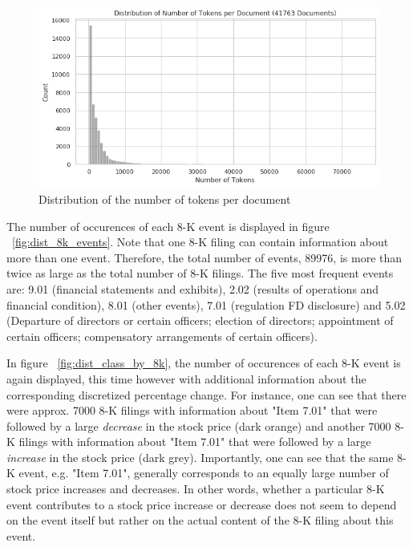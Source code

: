 \documentclass{article}
\begin{document}
	\begin{figure}[h!]
		\includegraphics[width=\linewidth]{img/dist_num_tokens.png}
		\caption{Distribution of the number of tokens per document}
		\label{fig:dist_num_tokens}
	\end{figure}

	The number of occurences of each 8-K event is displayed in figure ~\ref{fig:dist_8k_events}. Note that one 8-K filing can contain information about more than one event. Therefore, the total number of events, 89976, is more than twice as large as the total number of 8-K filings. The five most frequent events are: 9.01 (financial statements and exhibits), 2.02 (results of operations and financial condition), 8.01 (other events), 7.01 (regulation FD disclosure) and 5.02 (Departure of directors or certain officers; election of directors; appointment of certain officers; compensatory arrangements of certain officers).
	
	In figure ~\ref{fig:dist_class_by_8k}, the number of occurences of each 8-K event is again displayed, this time however with additional information about the corresponding discretized percentage change. For instance, one can see that there were approx. 7000 8-K filings with information about "Item 7.01" that were followed by a large \textit{decrease} in the stock price (dark orange) and another 7000 8-K filings with information about "Item 7.01" that were followed by a large \textit{increase} in the stock price (dark grey). Importantly, one can see that the same 8-K event, e.g. "Item 7.01", generally corresponds to an equally large number of stock price increases and decreases. In other words, whether a particular 8-K event contributes to a stock price increase or decrease does not seem to depend on the event itself but rather on the actual content of the 8-K filing about this event.
	
\end{document}
